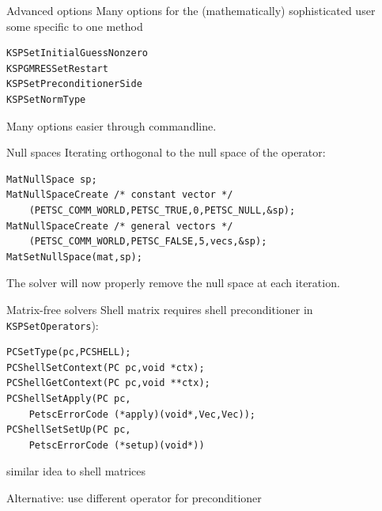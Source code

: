\begin{longstory}


\begin{numberedframe}{Advanced options}
Many options for the (mathematically) sophisticated user\\
some specific to one method
\begin{lstlisting}
KSPSetInitialGuessNonzero
KSPGMRESSetRestart
KSPSetPreconditionerSide
KSPSetNormType
\end{lstlisting}
Many options easier through commandline.
\end{numberedframe}

\begin{numberedframe}{Null spaces}
  Iterating orthogonal to the null space of the operator:
\begin{lstlisting}
MatNullSpace sp;
MatNullSpaceCreate /* constant vector */
    (PETSC_COMM_WORLD,PETSC_TRUE,0,PETSC_NULL,&sp);
MatNullSpaceCreate /* general vectors */
    (PETSC_COMM_WORLD,PETSC_FALSE,5,vecs,&sp);
MatSetNullSpace(mat,sp);
\end{lstlisting}

The solver will now properly remove the null space at each iteration.
\end{numberedframe}

\begin{numberedframe}{Matrix-free solvers}
Shell matrix requires shell preconditioner
in \lstinline{KSPSetOperators}):
\begin{lstlisting}
PCSetType(pc,PCSHELL);
PCShellSetContext(PC pc,void *ctx);
PCShellGetContext(PC pc,void **ctx);
PCShellSetApply(PC pc,
    PetscErrorCode (*apply)(void*,Vec,Vec));
PCShellSetSetUp(PC pc,
    PetscErrorCode (*setup)(void*))
\end{lstlisting}
similar idea to shell matrices

Alternative: use different operator for preconditioner
\end{numberedframe}

\begin{shortversion}


\end{shortversion}
\end{longstory}
